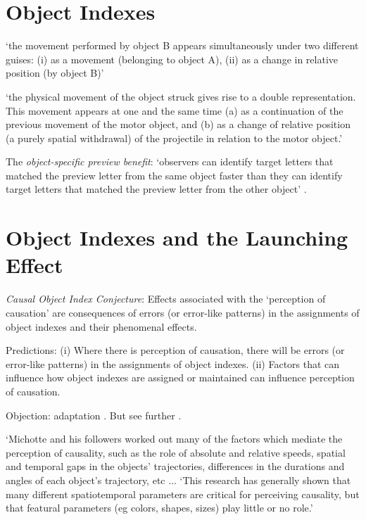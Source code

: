\documentclass[12pt]{extarticle}
\begin{document}
\begin{multicols*}{3}
\section{Object Indexes}

‘the movement performed by object B appears simultaneously under two
different guises: (i) as a movement (belonging to object A), (ii) as a
change in relative position (by object B)’
\citep[p.~136]{Michotte:1946nz}

‘the physical movement of the object struck gives rise to a double
representation. This movement appears at one and the same time (a) as a
continuation of the previous movement of the motor object, and (b) as a
change of relative position (a purely spatial withdrawal) of the projectile
in relation to the motor object.’
\citep[p.~140]{Michotte:1946nz}

The \emph{object-specific preview benefit}: ‘observers can identify target
letters that matched the preview letter from the same object faster than
they can identify target letters that matched the preview letter from the
other object’ \citep[p.\ 2]{Krushke:1996ge}.





\section{Object Indexes and the Launching Effect}

\emph{Causal Object Index Conjecture}:
Effects associated with the ‘perception of causation’
are consequences of errors (or error-like patterns) in the assignments of object indexes and
their phenomenal effects.

Predictions:
(i) Where there is perception of causation, there will be errors (or error-like patterns)
in the assignments of object indexes.
(ii) Factors that can influence how object indexes are assigned or maintained can influence
perception of causation.

Objection: adaptation \citep{rolfs:2013_visual}.
But see further \citet{johnston:2013_causalitymarnold:2015_objectcentered}.

‘Michotte and his followers worked out many of the factors which mediate
the perception of causality, such as the role of absolute and relative
speeds, spatial and temporal gaps in the objects' trajectories, differences
in the durations and angles of each object's trajectory, etc ...
‘This research has generally shown that many different  spatiotemporal parameters are critical for perceiving causality, but  that featural parameters (eg colors, shapes, sizes) play little or no role.’
\citep[p.~456]{Scholl:2004dx}


\end{multicols*}
\end{document}
